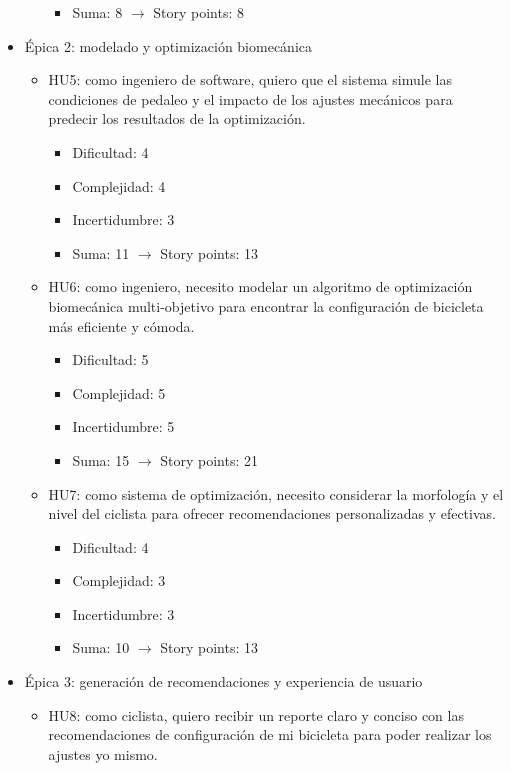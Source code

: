 \documentclass[
11pt, %
]{charter}
\begin{document}
\begin{itemize}
\begin{itemize}
\begin{itemize}
          \item Suma: 8 $\rightarrow$ Story points: 8
        \end{itemize}
    \end{itemize}
  \item Épica 2: modelado y optimización biomecánica
    \begin{itemize}
      \item HU5: como ingeniero de software, quiero que el sistema simule las condiciones de pedaleo y el impacto de los ajustes mecánicos para predecir los resultados de la optimización.
        \begin{itemize}
          \item Dificultad: 4
          \item Complejidad: 4
          \item Incertidumbre: 3
          \item Suma: 11 $\rightarrow$ Story points: 13
        \end{itemize}
      \item HU6: como ingeniero, necesito modelar un algoritmo de optimización biomecánica multi-objetivo para encontrar la configuración de bicicleta más eficiente y cómoda.
        \begin{itemize}
          \item Dificultad: 5
          \item Complejidad: 5
          \item Incertidumbre: 5
          \item Suma: 15 $\rightarrow$ Story points: 21
        \end{itemize}
      \item HU7: como sistema de optimización, necesito considerar la morfología y el nivel del ciclista para ofrecer recomendaciones personalizadas y efectivas.
        \begin{itemize}
          \item Dificultad: 4
          \item Complejidad: 3
          \item Incertidumbre: 3
          \item Suma: 10 $\rightarrow$ Story points: 13
        \end{itemize}
    \end{itemize}
  \item Épica 3: generación de recomendaciones y experiencia de usuario
    \begin{itemize}
      \item HU8: como ciclista, quiero recibir un reporte claro y conciso con las recomendaciones de configuración de mi bicicleta para poder realizar los ajustes yo mismo.

\end{itemize}
\end{itemize}
\end{document}
